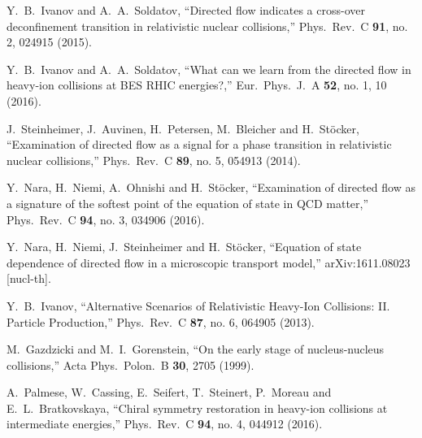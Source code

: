 \documentclass{webofc}
\begin{document}
\begin{thebibliography}{}
  Y.~B.~Ivanov and A.~A.~Soldatov,
  ``Directed flow indicates a cross-over deconfinement transition in relativistic nuclear collisions,''
  Phys.\ Rev.\ C {\bf 91}, no. 2, 024915 (2015).
  
  Y.~B.~Ivanov and A.~A.~Soldatov,
  ``What can we learn from the directed flow in heavy-ion collisions at BES RHIC energies?,''
  Eur.\ Phys.\ J.\ A {\bf 52}, no. 1, 10 (2016).

  J.~Steinheimer, J.~Auvinen, H.~Petersen, M.~Bleicher and H.~St\"ocker,
  ``Examination of directed flow as a signal for a phase transition in relativistic nuclear collisions,''
  Phys.\ Rev.\ C {\bf 89}, no. 5, 054913 (2014).

  Y.~Nara, H.~Niemi, A.~Ohnishi and H.~St\"ocker,
  ``Examination of directed flow as a signature of the softest point of the equation of state in QCD matter,''
  Phys.\ Rev.\ C {\bf 94}, no. 3, 034906 (2016).

  Y.~Nara, H.~Niemi, J.~Steinheimer and H.~St\"ocker,
  ``Equation of state dependence of directed flow in a microscopic transport model,''
  arXiv:1611.08023 [nucl-th].

 
  Y.~B.~Ivanov,
  ``Alternative Scenarios of Relativistic Heavy-Ion Collisions: II. Particle Production,''
  Phys.\ Rev.\ C {\bf 87}, no. 6, 064905 (2013).
%

  M.~Gazdzicki and M.~I.~Gorenstein,
  ``On the early stage of nucleus-nucleus collisions,''
  Acta Phys.\ Polon.\ B {\bf 30}, 2705 (1999).

  A.~Palmese, W.~Cassing, E.~Seifert, T.~Steinert, P.~Moreau and E.~L.~Bratkovskaya,
  ``Chiral symmetry restoration in heavy-ion collisions at intermediate energies,''
  Phys.\ Rev.\ C {\bf 94}, no. 4, 044912 (2016).

\end{thebibliography}
\end{document}
